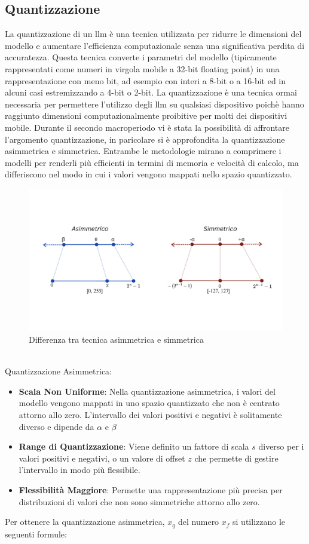     \subsection{Quantizzazione}
    La quantizzazione di un \gls{llm} è una tecnica utilizzata per ridurre le dimensioni del modello e aumentare l'efficienza computazionale senza una significativa perdita di accuratezza. Questa tecnica converte i parametri del modello (tipicamente rappresentati come numeri in virgola mobile a 32-bit floating point) in una rappresentazione con meno bit, ad esempio con interi a 8-bit o a 16-bit ed in alcuni casi estremizzando a 4-bit o 2-bit.
    La quantizzazione è una tecnica ormai necessaria per permettere l'utilizzo degli \gls{llm} su qualsiasi dispositivo poichè hanno raggiunto dimensioni computazionalmente proibitive per molti dei dispositivi mobile.
    Durante il secondo macroperiodo vi è stata la possibilità di affrontare l'argomento quantizzazione, in paricolare si è approfondita la quantizzazione asimmetrica e simmetrica.
    Entrambe le metodologie mirano a comprimere i modelli per renderli più efficienti in termini di memoria e velocità di calcolo, ma differiscono nel modo in cui i valori vengono mappati nello spazio quantizzato.
    \begin{figure}[htp]
    \centering
    \includegraphics[width=13cm]{img/AsymmetricSymmetric.pdf}
    \caption{Differenza tra tecnica asimmetrica e simmetrica}
    \end{figure}
    \\
    Quantizzazione Asimmetrica:
    \begin{itemize}
        \item \textbf{Scala Non Uniforme}: Nella quantizzazione asimmetrica, i valori del modello vengono mappati in uno spazio quantizzato che non è centrato attorno allo zero. L'intervallo dei valori positivi e negativi è solitamente diverso e dipende da $\alpha$ e $\beta$
        \item \textbf{Range di Quantizzazione}: Viene definito un fattore di scala $s$ diverso per i valori positivi e negativi, o un valore di offset $z$ che permette di gestire l'intervallo in modo più flessibile.
        \item \textbf{Flessibilità Maggiore}: Permette una rappresentazione più precisa per distribuzioni di valori che non sono simmetriche attorno allo zero.
    \end{itemize}
    Per ottenere la quantizzazione asimmetrica, $x_q$ del numero $x_f$ si utilizzano le seguenti formule:
    

